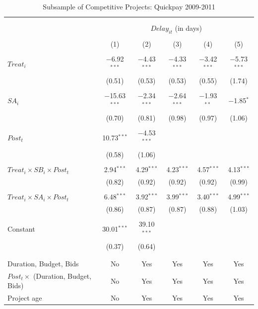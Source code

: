 \documentclass[
]{article}
\begin{document}
\begin{table}[H] \centering 
  \caption{Subsample of Competitive Projects: Quickpay 2009-2011} 
  \label{} 
\small 
\begin{tabular}{@{\extracolsep{-2pt}}lccccc} 
\\[-1.8ex]\hline 
\hline \\[-1.8ex] 
\\[-1.8ex] & \multicolumn{5}{c}{$Delay_{it}$ (in days)} \\ 
\\[-1.8ex] & (1) & (2) & (3) & (4) & (5)\\ 
\hline \\[-1.8ex] 
 $Treat_i$ & $-$6.92$^{***}$ & $-$4.43$^{***}$ & $-$4.33$^{***}$ & $-$3.42$^{***}$ & $-$5.73$^{***}$ \\ 
  & (0.51) & (0.53) & (0.53) & (0.55) & (1.74) \\ 
  & & & & & \\ 
 $SA_i$ & $-$15.63$^{***}$ & $-$2.34$^{***}$ & $-$2.64$^{***}$ & $-$1.93$^{**}$ & $-$1.85$^{*}$ \\ 
  & (0.70) & (0.81) & (0.98) & (0.97) & (1.06) \\ 
  & & & & & \\ 
 $Post_t$ & 10.73$^{***}$ & $-$4.53$^{***}$ &  &  &  \\ 
  & (0.58) & (1.06) &  &  &  \\ 
  & & & & & \\ 
 $Treat_i \times SB_i \times Post_t$ & 2.94$^{***}$ & 4.29$^{***}$ & 4.23$^{***}$ & 4.57$^{***}$ & 4.13$^{***}$ \\ 
  & (0.82) & (0.92) & (0.92) & (0.92) & (0.99) \\ 
  & & & & & \\ 
 $Treat_i \times SA_i \times Post_t$ & 6.48$^{***}$ & 3.92$^{***}$ & 3.99$^{***}$ & 3.40$^{***}$ & 4.99$^{***}$ \\ 
  & (0.86) & (0.87) & (0.87) & (0.88) & (1.03) \\ 
  & & & & & \\ 
 Constant & 30.01$^{***}$ & 39.10$^{***}$ &  &  &  \\ 
  & (0.37) & (0.64) &  &  &  \\ 
  & & & & & \\ 
\hline \\[-1.8ex] 
Duration, Budget, Bids & No & Yes & Yes & Yes & Yes \\ 
$Post_t \times $  (Duration, Budget, Bids) & No & Yes & Yes & Yes & Yes \\ 
Project age & No & Yes & Yes & Yes & Yes \\ 

\end{tabular}
\end{table}
\end{document}
